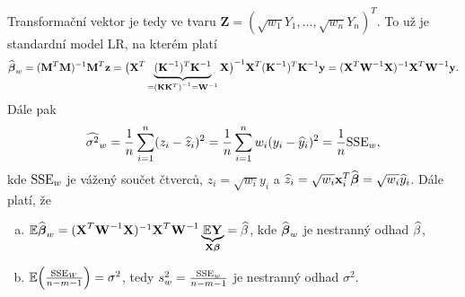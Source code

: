 Transformační vektor je tedy ve tvaru $\textbf{Z}=(\sqrt{w_1}Y_1,...,\sqrt{w_n}Y_n)^T$. To už je standardní model LR, na kterém platí
$$ \widehat{\boldsymbol{\beta}}_w={(\textbf{M}^T\textbf{M})^{-1}}\textbf{M}^T\textbf{z}={\big(\textbf{X}^T\underbrace{(\textbf{K}^{-1})^T {\textbf{K}^{-1}}}_{={{(\textbf{K}\textbf{K}^T)}^{-1}}={\textbf{W}^{-1}}}\textbf{X}\big)^{-1}}\textbf{X}^T({\textbf{K}^{-1}})^T{\textbf{K}^{-1}}\textbf{y}={(\textbf{X}^T{\textbf{W}^{-1}}\textbf{X})^{-1}}\textbf{X}^T{\textbf{W}^{-1}}\textbf{y}.$$
Dále pak 
$$\widehat{{\sigma}^2}_w=\frac{1}{n}\sum\limits_{i=1}^{n} (z_i-\widehat{z}_i)^2=\frac{1}{n}\sum\limits_{i=1}^{n} w_i(y_i-\widehat{y}_i)^2=\frac{1}{n}\mathrm{SSE}_w,$$ kde $\mathrm{SSE}_w$ je vážený součet čtverců, $z_i=\sqrt{w_i}y_i$ a $\widehat{z}_i=\sqrt{w_i}\textbf{x}_i^T\widehat{\boldsymbol{\beta}}=\sqrt{w_i}\widehat{y}_i$.
Dále platí, že\begin{enumerate}[a)]
	\item  $\mathbb{E}\widehat{\boldsymbol{\beta}}_w={(\textbf{X}^T{\textbf{W}^{-1}}\textbf{X})^{-1}}\textbf{X}^T{\textbf{W}^{-1}}\underbrace{\mathbb{E} \textbf{Y}}_{\textbf{X}\boldsymbol{\beta}}=\widehat{\beta}$, kde $\widehat{\boldsymbol{\beta}}_w$ je nestranný odhad $\widehat{\beta}$,
	\item $\mathbb{E}\Big(\frac{\mathrm{SSE}_W}{n-m-1}\Big)=\sigma^2$, tedy $s_w^2=\frac{\mathrm{SSE}_w}{n-m-1}$ je nestranný odhad $\sigma^2$.
\end{enumerate}
